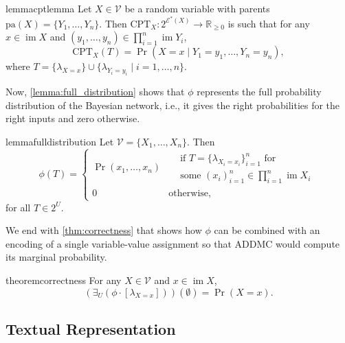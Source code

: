 \documentclass{uai2021} %
\theoremstyle{definition}
\DeclareMathOperator{\im}{im}
\begin{document}
\begin{restatable}{lemma}{cptlemma} \label{lemma:cpt}
  Let $X \in \mathcal{V}$ be a random variable with parents $\mathrm{pa}(X) = \{ Y_1,
  \dots, Y_n \}$. Then $\mathrm{CPT}_X\colon 2^{\mathcal{E}^*(X)} \to
  \mathbb{R}_{\ge 0}$ is such that for any $x \in \im X$ and $(y_1, \dots, y_n)
  \in \prod_{i=1}^n \im Y_i$,
  \[
    \mathrm{CPT}_X (T) = \Pr(X = x \mid Y_1 = y_1, \dots, Y_n = y_n),
  \]
  where $T = \{ \lambda_{X=x} \} \cup \{ \lambda_{Y_i=y_i} \mid i = 1, \dots, n
  \}$.
\end{restatable}

Now, \cref{lemma:full_distribution} shows that $\phi$ represents the full
probability distribution of the Bayesian network, i.e., it gives the right
probabilities for the right inputs and zero otherwise. 

\begin{restatable}{lemma}{fulldistribution} \label{lemma:full_distribution}
  Let $\mathcal{V} = \{X_1, \dots, X_n\}$. Then
  \[
    \phi(T) =
    \begin{cases}
      \Pr(x_1, \dots, x_n) &
      \begin{aligned}
        &\text{if } T = \{ \lambda_{X_i=x_i} \}_{i = 1}^n \text{ for} \\
        &\text{some } \textstyle (x_i)_{i=1}^n \in \prod_{i=1}^n \im X_i
      \end{aligned} \\
      0 & \text{otherwise,}
    \end{cases}
  \]
  for all $T \in 2^U$.
\end{restatable}

We end with \cref{thm:correctness} that shows how $\phi$ can be combined with an
encoding of a single variable-value assignment so that \textsf{ADDMC} would
compute its marginal probability.

\begin{restatable}{theorem}{correctness} \label{thm:correctness}
  For any $X \in \mathcal{V}$ and $x \in \im X$,
  \[
    (\exists_U(\phi \cdot [\lambda_{X=x}]))(\emptyset) = \Pr(X = x).
  \]
\end{restatable}

\subsection{Textual Representation} \label{sec:textual_representation}
\end{document}
